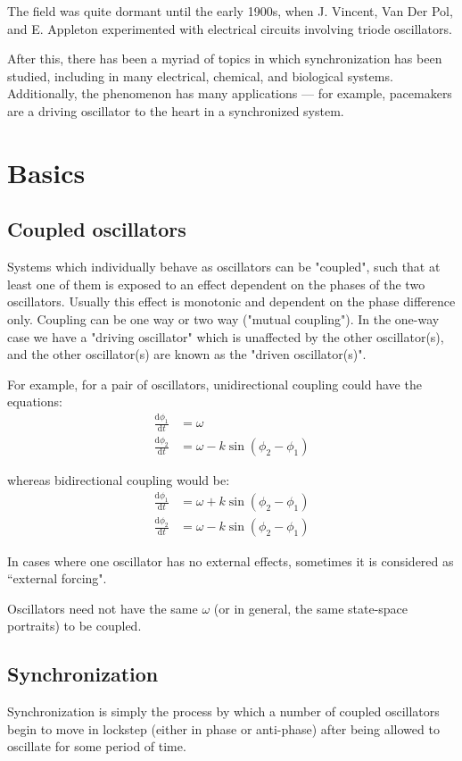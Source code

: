 \documentclass[12pt]{article}
\newcommand{\dt}[1]{\frac{\mathrm d #1}{\mathrm dt}}
\begin{document}
The field was quite dormant until the early 1900s, when J. Vincent\cite{vincent1919some}, Van Der Pol\cite{van1920theory}, and E. Appleton\cite{appleton1922automatic} experimented with electrical circuits involving triode oscillators.

After this, there has been a myriad of topics in which synchronization has been studied, including in many electrical, chemical, and biological systems. Additionally, the phenomenon has many applications --- for example, pacemakers are a driving oscillator to the heart in a synchronized system.

\section{Basics}
\subsection{Coupled oscillators}
Systems which individually behave as oscillators can be "coupled", such that at least one of them is exposed to an effect dependent on the phases of the two oscillators. Usually this effect is monotonic and dependent on the phase difference only. Coupling can be one way or two way ("mutual coupling"). In the one-way case we have a "driving oscillator" which is unaffected by the other oscillator(s), and the other oscillator(s) are known as the "driven oscillator(s)".

For example, for a pair of oscillators, unidirectional coupling could have the equations:
\begin{align*}
\dt{\phi_1} &= \omega \\
\dt{\phi_2} &= \omega - k\sin(\phi_2 - \phi_1)
\end{align*}

whereas bidirectional coupling would be:
\begin{align*}
\dt{\phi_1} &= \omega + k\sin(\phi_2 - \phi_1)\\
\dt{\phi_2} &= \omega - k\sin(\phi_2 - \phi_1)
\end{align*}

In cases where one oscillator has no external effects, sometimes it is considered as ``external forcing".


Oscillators need not have the same $\omega$ (or in general, the same state-space portraits) to be coupled.

\subsection{Synchronization}
Synchronization is simply the process by which a number of coupled oscillators begin to move in lockstep (either in phase or anti-phase) after being allowed to oscillate for some period of time.
\end{document}
